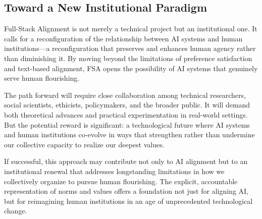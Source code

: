 \subsection{Toward a New Institutional Paradigm}

Full-Stack Alignment is not merely a technical project but an institutional one. It calls for a reconfiguration of the relationship between AI systems and human institutions—a reconfiguration that preserves and enhances human agency rather than diminishing it. By moving beyond the limitations of preference satisfaction and text-based alignment, FSA opens the possibility of AI systems that genuinely serve human flourishing.

The path forward will require close collaboration among technical researchers, social scientists, ethicists, policymakers, and the broader public. It will demand both theoretical advances and practical experimentation in real-world settings. But the potential reward is significant: a technological future where AI systems and human institutions co-evolve in ways that strengthen rather than undermine our collective capacity to realize our deepest values.

If successful, this approach may contribute not only to AI alignment but to an institutional renewal that addresses longstanding limitations in how we collectively organize to pursue human flourishing. The explicit, accountable representation of norms and values offers a foundation not just for aligning AI, but for reimagining human institutions in an age of unprecedented technological change.